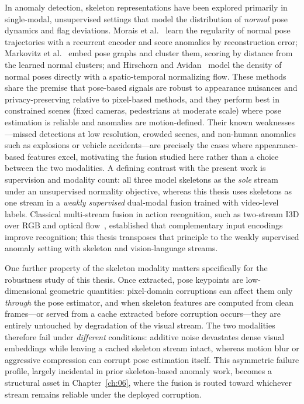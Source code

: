 In anomaly detection, skeleton representations have been explored primarily in single-modal,
unsupervised settings that model the distribution of \emph{normal} pose dynamics and flag
deviations. Morais et al.~\cite{morais2019skeleton} learn the regularity of normal pose
trajectories with a recurrent encoder and score anomalies by reconstruction error; Markovitz et
al.~\cite{markovitz2020gepc} embed pose graphs and cluster them, scoring by distance from the
learned normal clusters; and Hirschorn and Avidan~\cite{hirschorn2023stgnf} model the density of
normal poses directly with a spatio-temporal normalizing flow. These methods share the premise that
pose-based signals are robust to appearance nuisances and privacy-preserving relative to
pixel-based methods, and they perform best in constrained scenes (fixed cameras, pedestrians at
moderate scale) where pose estimation is reliable and anomalies are motion-defined. Their known
weaknesses---missed detections at low resolution, crowded scenes, and non-human anomalies such as
explosions or vehicle accidents---are precisely the cases where appearance-based features excel,
motivating the fusion studied here rather than a choice between the two modalities. A defining
contrast with the present work is supervision and modality count: all three model skeletons as the
\emph{sole} stream under an unsupervised normality objective, whereas this thesis uses skeletons as
one stream in a \emph{weakly supervised} dual-modal fusion trained with video-level labels.
Classical multi-stream fusion in
action recognition, such as two-stream I3D over RGB and optical flow~\cite{carreira2017i3d},
established that complementary input encodings improve recognition; this thesis transposes that
principle to the weakly supervised anomaly setting with skeleton and vision-language streams.

One further property of the skeleton modality matters specifically for the robustness study of
this thesis. Once extracted, pose keypoints are low-dimensional geometric quantities: pixel-domain
corruptions can affect them only \emph{through} the pose estimator, and when skeleton features are
computed from clean frames---or served from a cache extracted before corruption occurs---they are
entirely untouched by degradation of the visual stream. The two modalities therefore fail under
\emph{different} conditions: additive noise devastates dense visual embeddings while leaving a
cached skeleton stream intact, whereas motion blur or aggressive compression can corrupt pose
estimation itself. This asymmetric failure profile, largely incidental in prior skeleton-based
anomaly work, becomes a structural asset in Chapter~\ref{ch:06}, where the fusion is routed toward
whichever stream remains reliable under the deployed corruption.

